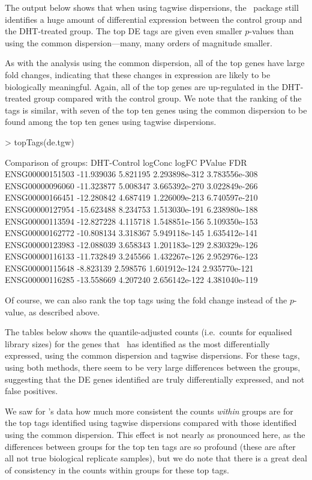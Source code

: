 The output below shows that when using tagwise dispersions, the
\edgeR~package still identifies a huge amount of differential
expression between the control group and the DHT-treated group. The
top DE tags are given even smaller $p$-values than using the common
dispersion---many, many orders of magnitude smaller.

As with the analysis using the common dispersion, all of the top genes
have large fold changes, indicating that these changes in expression
are likely to be biologically meaningful. Again, all of the top genes
are up-regulated in the DHT-treated group compared with the control
group. We note that the ranking of the tags is similar, with seven of
the top ten genes using the common dispersion to be found among the
top ten genes using tagwise dispersions.

\begin{Schunk}
\begin{Sinput}
> topTags(de.tgw)
\end{Sinput}
\begin{Soutput}
Comparison of groups: DHT-Control 
                   logConc    logFC        PValue           FDR
ENSG00000151503 -11.939036 5.821195 2.293898e-312 3.783556e-308
ENSG00000096060 -11.323877 5.008347 3.665392e-270 3.022849e-266
ENSG00000166451 -12.280842 4.687419 1.226009e-213 6.740597e-210
ENSG00000127954 -15.623488 8.234753 1.513030e-191 6.238980e-188
ENSG00000113594 -12.827228 4.115718 1.548851e-156 5.109350e-153
ENSG00000162772 -10.808134 3.318367 5.949118e-145 1.635412e-141
ENSG00000123983 -12.088039 3.658343 1.201183e-129 2.830329e-126
ENSG00000116133 -11.732849 3.245566 1.432267e-126 2.952976e-123
ENSG00000115648  -8.823139 2.598576 1.601912e-124 2.935770e-121
ENSG00000116285 -13.558669 4.207240 2.656142e-122 4.381040e-119
\end{Soutput}
\end{Schunk}

Of course, we can also rank the top tags using the fold change instead
of the $p$-value, as described above.

The tables below shows the quantile-adjusted counts (i.e.~counts for
equalised library sizes) for the genes that \edgeR~has identified as
the most differentially expressed, using the common dispersion and
tagwise dispersions. For these tags, using both methods, there seem to
be very large differences between the groups, suggesting that the DE
genes identified are truly differentially expressed, and not false
positives.

We saw for \citet{THoen:2008p9}'s data how much more consistent the
counts \emph{within} groups are for the top tags identified using
tagwise dispersions compared with those identified using the common
dispersion. This effect is not nearly as pronounced here, as the
differences between groups for the top ten tags are so profound (these
are after all not true biological replicate samples), but we do note
that there is a great deal of consistency in the counts within groups
for these top tags.

